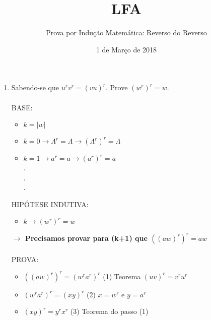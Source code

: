 \documentclass[a4paper,12pt]{article}
\title{LFA}
\author{Prova por Indução Matemática: Reverso do Reverso}
\date{1 de Março de 2018}
\begin{document}
\maketitle

\begin{enumerate}
	\item Sabendo-se que $u^rv^r=(vu)^r$. Prove $(w^r)^r=w$.\\\\
	
	
	BASE:
	\begin{itemize}
		
	
		
		\item $k=|w|$
		\item $k=0 \rightarrow \Lambda^r = \Lambda \rightarrow (\Lambda^r)^r = \Lambda$
		\item $k=1 \rightarrow a^r = a \rightarrow (a^r)^r = a$\\
		.\\
		.\\
		.\\
		
		
			
	\end{itemize}
	
	HIPÓTESE INDUTIVA:
	\begin{itemize}
		\item $k \rightarrow (w^r)^r=w $\\
		

		\end{itemize}
			\textbf{$\rightarrow$ Precisamos provar para (k+1) que $((aw)^r)^r = aw $}  \\\\
	
	PROVA:
	\begin{itemize}

		
		 \item$((aw)^r)^r=(w^ra^r)^r$ \space\space\space\space\space\space\space\space\space\space\space\space\space\space\space\space 
		 (1) Teorema $(uv)^r=v^ru^r$
		 
		 \item$(w^ra^r)^r=(xy)^r$ \space\space\space\space\space\space\space\space\space\space\space\space\space\space\space\space\space\space\space\space 
		 (2) $x=w^r$ e $y=a^r$
		
		\item $(xy)^r = y^rx^r$\space\space\space\space\space\space\space\space\space\space\space\space\space\space\space\space\space\space\space\space\space\space\space\space\space 
		(3) Teorema do passo (1)
		 

\end{itemize}
\end{enumerate}
\end{document}
